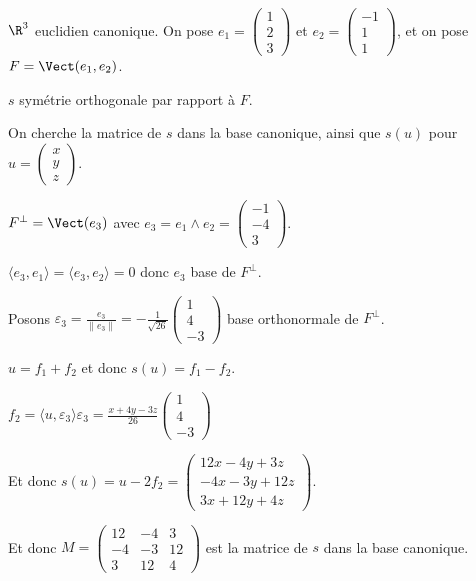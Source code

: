 \begin{exemple}
    $\R^3$ euclidien canonique. 
    On pose $e_1 = \begin{pmatrix}
        1 \\ 2 \\ 3 
    \end{pmatrix}$ et $e_2 = \begin{pmatrix}
        -1 \\ 1 \\ 1
    \end{pmatrix}$, et on pose $F = \Vect(e_1, e_2)$.

    $s$ symétrie orthogonale par rapport à $F$. 

    On cherche la matrice de $s$ dans la base canonique, ainsi que $s(u)$ pour $u = \begin{pmatrix}
        x \\ y \\z 
    \end{pmatrix}$.

    \avspace $F^\perp = \Vect(e_3)$ avec $e_3 = e_1 \wedge e_2 = \begin{pmatrix}
        -1 \\ -4 \\ 3
    \end{pmatrix}$.

    $\langle e_3, e_1 \rangle = \langle e_3, e_2 \rangle = 0$ donc $e_3$ base de $F^\perp$. 

    Posons $\varepsilon_3 = \frac{e_3}{\|e_3\|} = - \frac 1 {\sqrt {26}} \begin{pmatrix}
        1 \\ 4 \\ -3
    \end{pmatrix}$ base orthonormale de $F^\perp$.

    $u = f_1 + f_2$ et donc $s(u) = f_1 - f_2$.

    $f_2 = \langle u, \varepsilon_3 \rangle \varepsilon_3 = \frac{x + 4y - 3z}{26} \begin{pmatrix}
        1 \\ 4 \\ -3
    \end{pmatrix}$

    Et donc $s(u) = u - 2 f_2 = \begin{pmatrix}
        12x - 4y + 3z \\ -4x - 3 y + 12z \\ 3x + 12y + 4z
    \end{pmatrix}$.

    Et donc $M = \begin{pmatrix}
        12 & -4 & 3 \\
        -4 & -3 & 12 \\
        3 & 12 & 4
    \end{pmatrix}$ est la matrice de $s$ dans la base canonique.
\end{exemple}

